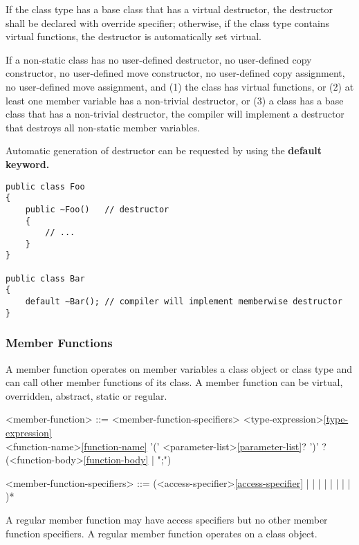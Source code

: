 \documentclass[a4paper,oneside,11pt]{article}
\begin{document}
If the class type has a base class that has a virtual destructor, the destructor shall be declared with override specifier;
otherwise, if the class type contains virtual functions, the destructor is automatically set virtual.

If a non-static class has no user-defined destructor,
no user-defined copy constructor, no user-defined move constructor, no user-defined copy assignment, no user-defined move assignment, and
(1) the class has virtual functions,
or (2) at least one member variable has a non-trivial destructor,
or (3) a class has a base class that has a non-trivial destructor,
the compiler will implement a destructor that destroys all non-static member variables.

Automatic generation of destructor can be requested by using the \bf{default} keyword.

\begin{lstlisting}[frame=trBL]
public class Foo
{
    public ~Foo()   // destructor
    {
        // ...
    }
}

public class Bar
{
    default ~Bar(); // compiler will implement memberwise destructor
}
\end{lstlisting}

\subsubsection{Member Functions}

A member function operates on member variables a class object or class type and can call
other member functions of its class.
A member function can be virtual, overridden, abstract, static or regular.

\begin{grammar}
\label{member-function}<member-function> ::= <member-function-specifiers> <type-expression>\ref{type-expression}\\
<function-name>\ref{function-name} '(' <parameter-list>\ref{parameter-list}? ')' ?
(<function-body>\ref{function-body} | ";")

<member-function-specifiers> ::= (<access-specifier>\ref{access-specifier}
\alt {} |  |  |  |  |  |  |  | )*
\end{grammar}

A regular member function may have access specifiers but no other member function specifiers.
A regular member function operates on a class object.
\end{document}
